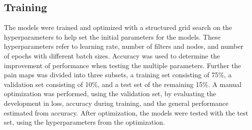 \subsection{Training}
The models were trained and optimized with a structured grid search on the hyperparameters to help set the initial parameters for the models. These hyperparameters refer to learning rate, number of filters and nodes, and number of epochs with different batch sizes. Accuracy was used to determine the improvement of performance when testing the multiple parameters.
Further the pain maps was divided into three subsets, a training set consisting of 75\%, a validation set consisting of 10\%, and a test set of the remaining 15\%. A manual optimization was performed, using the validation set, by evaluating the development in loss, accuracy during training, and the general performance estimated from accuracy. After optimization, the models were tested with the test set, using the hyperparameters from the optimization.
 




